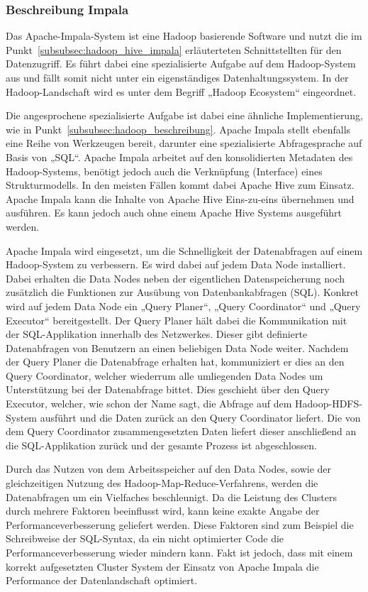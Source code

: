 \subsubsection{Beschreibung Impala}
\label{subsubsec:impala_beschreibung}
Das Apache-Impala-System ist eine Hadoop basierende Software und nutzt die
im Punkt~\ref{subsubsec:hadoop_hive_impala} erläuterteten Schnittstellten
für den Datenzugriff. Es führt dabei eine spezialisierte Aufgabe auf dem
Hadoop-System aus und fällt somit nicht unter ein eigenständiges
Datenhaltungssystem. In der Hadoop-Landschaft wird es unter dem Begriff
„Hadoop Ecosystem“ eingeordnet.

Die angesprochene spezialisierte Aufgabe ist dabei eine ähnliche
Implementierung, wie in Punkt~\ref{subsubsec:hadoop_beschreibung}. Apache
Impala stellt ebenfalls eine Reihe von Werkzeugen bereit, darunter eine
spezialisierte Abfragesprache auf Basis von „SQL“. Apache Impala arbeitet auf
den konsolidierten Metadaten des Hadoop-Systems, benötigt jedoch auch die
Verknüpfung (Interface) eines Strukturmodells. In den meisten Fällen kommt
dabei Apache Hive zum Einsatz. Apache Impala kann die Inhalte von Apache Hive
Eins-zu-eins übernehmen und ausführen. Es kann jedoch auch ohne einem Apache
Hive Systems ausgeführt werden.

Apache Impala wird eingesetzt, um die Schnelligkeit der Datenabfragen auf einem
Hadoop-System zu verbessern. Es wird dabei auf jedem Data Node installiert.
Dabei erhalten die Data Nodes neben der eigentlichen Datenspeicherung noch
zusätzlich die Funktionen zur Ausübung von Datenbankabfragen (SQL). Konkret
wird auf jedem Data Node ein „Query Planer“, „Query Coordinator“ und „Query
Executor“ bereitgestellt. Der Query Planer hält dabei die Kommunikation mit der
SQL-Applikation innerhalb des Netzwerkes. Dieser gibt definierte Datenabfragen
von Benutzern an einen beliebigen Data Node weiter. Nachdem der Query Planer
die Datenabfrage erhalten hat, kommuniziert er dies an den Query Coordinator,
welcher wiederrum alle umliegenden Data Nodes um Unterstützung bei der
Datenabfrage bittet. Dies geschieht über den Query Executor, welcher, wie schon
der Name sagt, die Abfrage auf dem Hadoop-HDFS-System ausführt und die Daten
zurück an den Query Coordinator liefert. Die von dem Query Coordinator
zusammengesetzten Daten liefert dieser anschließend an die SQL-Applikation
zurück und der gesamte Prozess ist abgeschlossen.

Durch das Nutzen von dem Arbeitsspeicher auf den Data Nodes, sowie der
gleichzeitigen Nutzung des Hadoop-Map-Reduce-Verfahrens, werden die
Datenabfragen um ein Vielfaches beschleunigt. Da die Leistung des Clusters
durch mehrere Faktoren beeinflusst wird, kann keine exakte Angabe der
Performanceverbesserung geliefert werden. Diese Faktoren sind zum Beispiel die
Schreibweise der SQL-Syntax, da ein nicht optimierter Code die
Performanceverbesserung wieder mindern kann. Fakt ist jedoch, dass mit einem
korrekt aufgesetzten Cluster System der Einsatz von Apache Impala die
Performance der Datenlandschaft optimiert.
\nl%

